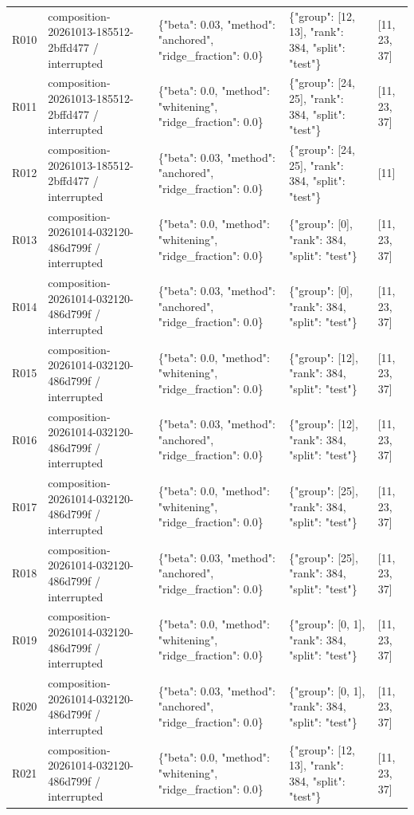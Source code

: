 \documentclass[10pt]{article}
\begin{document}
{\begin{longtable}{p{}p{}p{}p{}p{}}
R010 & composition-20261013-185512-2bffd477 / interrupted & \{"beta": 0.03, "method": "anchored", "ridge\_fraction": 0.0\} & \{"group": [12, 13], "rank": 384, "split": "test"\} & [11, 23, 37] \\
R011 & composition-20261013-185512-2bffd477 / interrupted & \{"beta": 0.0, "method": "whitening", "ridge\_fraction": 0.0\} & \{"group": [24, 25], "rank": 384, "split": "test"\} & [11, 23, 37] \\
R012 & composition-20261013-185512-2bffd477 / interrupted & \{"beta": 0.03, "method": "anchored", "ridge\_fraction": 0.0\} & \{"group": [24, 25], "rank": 384, "split": "test"\} & [11] \\
R013 & composition-20261014-032120-486d799f / interrupted & \{"beta": 0.0, "method": "whitening", "ridge\_fraction": 0.0\} & \{"group": [0], "rank": 384, "split": "test"\} & [11, 23, 37] \\
R014 & composition-20261014-032120-486d799f / interrupted & \{"beta": 0.03, "method": "anchored", "ridge\_fraction": 0.0\} & \{"group": [0], "rank": 384, "split": "test"\} & [11, 23, 37] \\
R015 & composition-20261014-032120-486d799f / interrupted & \{"beta": 0.0, "method": "whitening", "ridge\_fraction": 0.0\} & \{"group": [12], "rank": 384, "split": "test"\} & [11, 23, 37] \\
R016 & composition-20261014-032120-486d799f / interrupted & \{"beta": 0.03, "method": "anchored", "ridge\_fraction": 0.0\} & \{"group": [12], "rank": 384, "split": "test"\} & [11, 23, 37] \\
R017 & composition-20261014-032120-486d799f / interrupted & \{"beta": 0.0, "method": "whitening", "ridge\_fraction": 0.0\} & \{"group": [25], "rank": 384, "split": "test"\} & [11, 23, 37] \\
R018 & composition-20261014-032120-486d799f / interrupted & \{"beta": 0.03, "method": "anchored", "ridge\_fraction": 0.0\} & \{"group": [25], "rank": 384, "split": "test"\} & [11, 23, 37] \\
R019 & composition-20261014-032120-486d799f / interrupted & \{"beta": 0.0, "method": "whitening", "ridge\_fraction": 0.0\} & \{"group": [0, 1], "rank": 384, "split": "test"\} & [11, 23, 37] \\
R020 & composition-20261014-032120-486d799f / interrupted & \{"beta": 0.03, "method": "anchored", "ridge\_fraction": 0.0\} & \{"group": [0, 1], "rank": 384, "split": "test"\} & [11, 23, 37] \\
R021 & composition-20261014-032120-486d799f / interrupted & \{"beta": 0.0, "method": "whitening", "ridge\_fraction": 0.0\} & \{"group": [12, 13], "rank": 384, "split": "test"\} & [11, 23, 37] \\

\end{longtable}}
\end{document}

